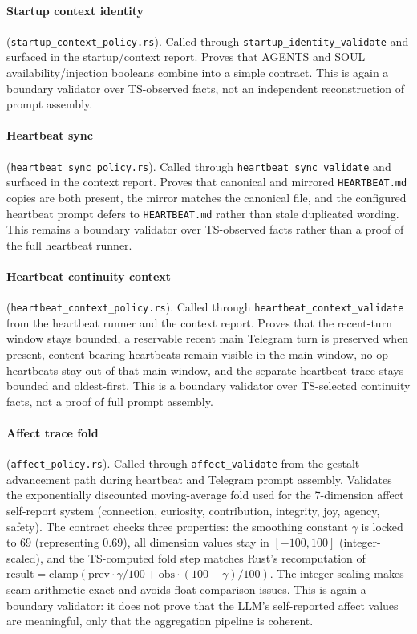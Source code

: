 \documentclass[11pt]{article}
\begin{document}
\paragraph{Startup context identity} (\texttt{startup\_context\_policy.rs}). Called through \texttt{startup\_identity\_validate} and surfaced in the startup/context report. Proves that AGENTS and SOUL availability/injection booleans combine into a simple contract. This is again a boundary validator over TS-observed facts, not an independent reconstruction of prompt assembly.

\paragraph{Heartbeat sync} (\texttt{heartbeat\_sync\_policy.rs}). Called through \texttt{heartbeat\_sync\_validate} and surfaced in the context report. Proves that canonical and mirrored \texttt{HEARTBEAT.md} copies are both present, the mirror matches the canonical file, and the configured heartbeat prompt defers to \texttt{HEARTBEAT.md} rather than stale duplicated wording. This remains a boundary validator over TS-observed facts rather than a proof of the full heartbeat runner.

\paragraph{Heartbeat continuity context} (\texttt{heartbeat\_context\_policy.rs}). Called through \texttt{heartbeat\_context\_validate} from the heartbeat runner and the context report. Proves that the recent-turn window stays bounded, a reservable recent main Telegram turn is preserved when present, content-bearing heartbeats remain visible in the main window, no-op heartbeats stay out of that main window, and the separate heartbeat trace stays bounded and oldest-first. This is a boundary validator over TS-selected continuity facts, not a proof of full prompt assembly.

\paragraph{Affect trace fold} (\texttt{affect\_policy.rs}). Called through \texttt{affect\_validate} from the gestalt advancement path during heartbeat and Telegram prompt assembly. Validates the exponentially discounted moving-average fold used for the 7-dimension affect self-report system (connection, curiosity, contribution, integrity, joy, agency, safety). The contract checks three properties: the smoothing constant $\gamma$ is locked to 69 (representing 0.69), all dimension values stay in $[-100, 100]$ (integer-scaled), and the TS-computed fold step matches Rust's recomputation of $\mathrm{result} = \mathrm{clamp}(\mathrm{prev} \cdot \gamma / 100 + \mathrm{obs} \cdot (100 - \gamma) / 100)$. The integer scaling makes seam arithmetic exact and avoids float comparison issues. This is again a boundary validator: it does not prove that the LLM's self-reported affect values are meaningful, only that the aggregation pipeline is coherent.
\end{document}
